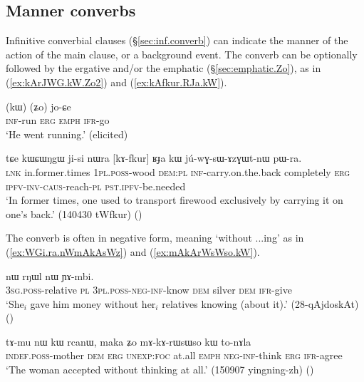 \subsection{Manner converbs} \label{sec:manner.converbs}
Infinitive converbial clauses (§\ref{sec:inf.converb}) can indicate the manner of the action of the main clause, or a background event. The converb can be optionally followed by the ergative  and/or the emphatic  (§\ref{sec:emphatic.Zo}), as in (\ref{ex:kArJWG.kW.Zo2}) and (\ref{ex:kAfkur.RJa.kW}).

\begin{exe}
\ex \label{ex:kArJWG.kW.Zo2}
\gll [kɤ-rɟɯɣ] (kɯ) (ʑo) jo-ɕe \\
\textsc{inf}-run \textsc{erg} \textsc{emph} \textsc{ifr}-go \\
\glt `He went running.' (elicited)
\end{exe}

\begin{exe}
\ex \label{ex:kAfkur.RJa.kW}
\gll tɕe kɯɕɯŋgɯ ji-si nɯra [kɤ-fkur] ʁɟa kɯ jú-wɣ-sɯ-ɤzɣɯt-nɯ pɯ-ra. \\
\textsc{lnk} in.former.times \textsc{1pl}.\textsc{poss}-wood \textsc{dem}:\textsc{pl} \textsc{inf}-carry.on.the.back completely \textsc{erg} \textsc{ipfv}-\textsc{inv}-\textsc{caus}-reach-\textsc{pl} \textsc{pst}.\textsc{ipfv}-be.needed \\
\glt `In former times, one used to transport firewood exclusively by carrying it on one's back.' (140430 tWfkur)
()
\end{exe}


The converb is often in negative form, meaning `without ...ing' as in  (\ref{ex:WGi.ra.nWmAkAsWz}) and (\ref{ex:mAkArWsWso.kW}).

\begin{exe}
\ex \label{ex:WGi.ra.nWmAkAsWz}
\gll  [ɯ-ɣi ra nɯ-mɤ-kɤ-sɯz] nɯ rŋɯl nɯ ɲɤ-mbi. \\
\textsc{3sg}.\textsc{poss}-relative \textsc{pl} \textsc{3pl}.\textsc{poss}-\textsc{neg}-\textsc{inf}-know \textsc{dem} silver \textsc{dem} \textsc{ifr}-give \\
\glt `She$_i$ gave him money without her$_i$ relatives knowing (about it).' (28-qAjdoskAt)
()
\end{exe}


\begin{exe}
\ex \label{ex:mAkArWsWso.kW}
\gll  tɤ-mu nɯ kɯ rcanɯ, maka ʑo mɤ-kɤ-rɯsɯso kɯ to-nɤla \\
\textsc{indef}.\textsc{poss}-mother \textsc{dem} \textsc{erg} \textsc{unexp}:\textsc{foc} at.all \textsc{emph} \textsc{neg}-\textsc{inf}-think \textsc{erg} \textsc{ifr}-agree \\
\glt `The woman accepted without thinking at all.' (150907 yingning-zh)
()
\end{exe}

